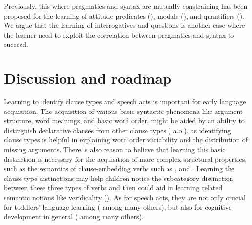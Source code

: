 Previously, this \hypos{} where pragmatics and syntax are mutually constraining has been proposed for the learning of attitude predicates (\citealt{dudleyetal2018, hacquardlidz2018}), modals (\citealt{dieuleveut2021}), and quantifiers (\citealt{knowlton2021}). We argue that the learning of interrogatives and questions is another case where the learner need to exploit the correlation between pragmatics and syntax to succeed.  






\section{Discussion and roadmap}
\label{sec:intro:roadmap}

Learning to identify clause types and speech acts is important for early language acquisition. The acquisition of various basic syntactic phenomena like argument structure, word meanings, and basic word order, might be aided by an ability to distinguish declarative clauses from other clause types (\citealt{pinker1984, pinker1989, gleitman1990, frankgoldwaterfrank2013, perkins2019} a.o.), as identifying clause types is helpful in explaining word order variability and the distribution of missing arguments. There is also reason to believe that learning this basic distinction is necessary for the acquisition of more complex structural properties, such as the semantics of clause-embedding verbs such as ,  and . Learning the clause type distinctions may help children notice the subcategory distinction between these three types of verbs and then could aid in learning related semantic notions like veridicality (\citealt{white2015diss, lewis2017think,dudley2017,hacquardlidz2018}). As for speech acts, they are not only crucial for toddlers' language learning (\citealt{ninio1980, hoff1985cds,yoder1994,rowland2003cdswh, valian2003cds, rowe2017wh, gaudreau2021question} among many others), but also for cognitive development in general (\citealt{hohmann1995educating} among many others). 

